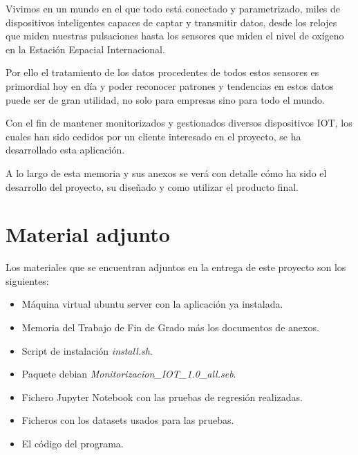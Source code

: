 

Vivimos en un mundo en el que todo está conectado y parametrizado, miles de dispositivos inteligentes capaces de captar y transmitir datos, desde los relojes que miden nuestras pulsaciones hasta los sensores que miden el nivel de oxígeno en la Estación Espacial Internacional.

Por ello el tratamiento de los datos procedentes de todos estos sensores es primordial hoy en día y poder reconocer patrones y tendencias en estos datos puede ser de gran utilidad, no solo para empresas sino para todo el mundo.

Con el fin de mantener monitorizados y gestionados diversos dispositivos IOT, los cuales han sido cedidos por un cliente interesado en el proyecto, se ha desarrollado esta aplicación.

A lo largo de esta memoria y sus anexos se verá con detalle cómo ha sido el desarrollo del proyecto, su diseñado y como utilizar el producto final. 

\section{Material adjunto}
Los materiales que se encuentran adjuntos en la entrega de este proyecto son los siguientes:
\begin{itemize}
    \item Máquina virtual ubuntu server con la aplicación ya instalada.
    \item Memoria del Trabajo de Fin de Grado más los documentos de anexos.
    \item Script de instalación \textit{install.sh}.
    \item Paquete debian \textit{Monitorizacion\_IOT\_1.0\_all.seb}.
    \item Fichero Jupyter Notebook con las pruebas de regresión realizadas.
    \item Ficheros con los datasets usados para las pruebas.
    \item El código del programa.
\end{itemize}
